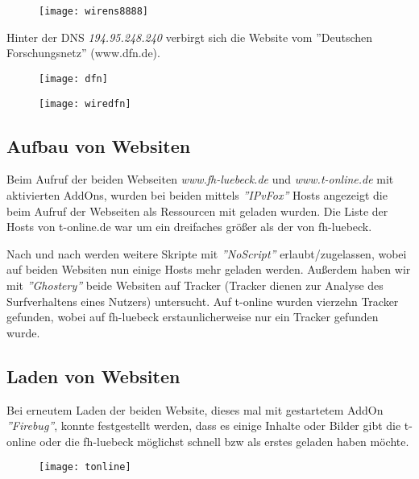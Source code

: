 \documentclass{scrartcl}
\begin{document}
  \begin{figure}
  \centering
    \texttt{[image: wirens8888]}
    \label{fig:wirens8888}
  \end{figure}
  
  Hinter der DNS \textit{194.95.248.240} verbirgt sich die Website vom ''Deutschen Forschungsnetz'' (www.dfn.de).
  
    \begin{figure}
  \centering
    \texttt{[image: dfn]}
    \label{fig:dfn}
  \end{figure}
  
  \begin{figure}
  \centering
    \texttt{[image: wiredfn]}
    \label{fig:wiredfn}
  \end{figure}
  
  \subsection[Aufgabe 6 Aufbau von Websiten]{Aufbau von Websiten}
  
  Beim Aufruf der beiden Webseiten \emph{\textit{www.fh-luebeck.de}} und \emph{\textit{www.t-online.de}} mit aktivierten AddOns, wurden bei beiden mittels \textit{''IPvFox''} Hosts angezeigt die beim Aufruf der Webseiten als Ressourcen mit geladen wurden. Die Liste der Hosts von t-online.de war um ein dreifaches größer als der von fh-luebeck. 
  
  Nach und nach werden weitere Skripte mit \textit{''NoScript''} erlaubt/zugelassen, wobei auf beiden Websiten nun einige Hosts mehr geladen werden. Außerdem haben wir mit \textit{''Ghostery''} beide Websiten auf Tracker (Tracker dienen zur Analyse des Surfverhaltens eines Nutzers) untersucht. Auf t-online wurden vierzehn Tracker gefunden, wobei auf fh-luebeck erstaunlicherweise nur ein Tracker gefunden wurde.
  
  \subsection[Aufgabe 7 Laden von Websiten]{Laden von Websiten}
  
  Bei erneutem Laden der beiden Website, dieses mal mit gestartetem AddOn \textit{''Firebug''}, konnte festgestellt werden, dass es einige Inhalte oder Bilder gibt die t-online oder die fh-luebeck möglichst schnell bzw als erstes geladen haben möchte. 
  
  \begin{figure}
    \texttt{[image: tonline]}
    \label{fig:tonline}
  \end{figure}
  
\end{document}
